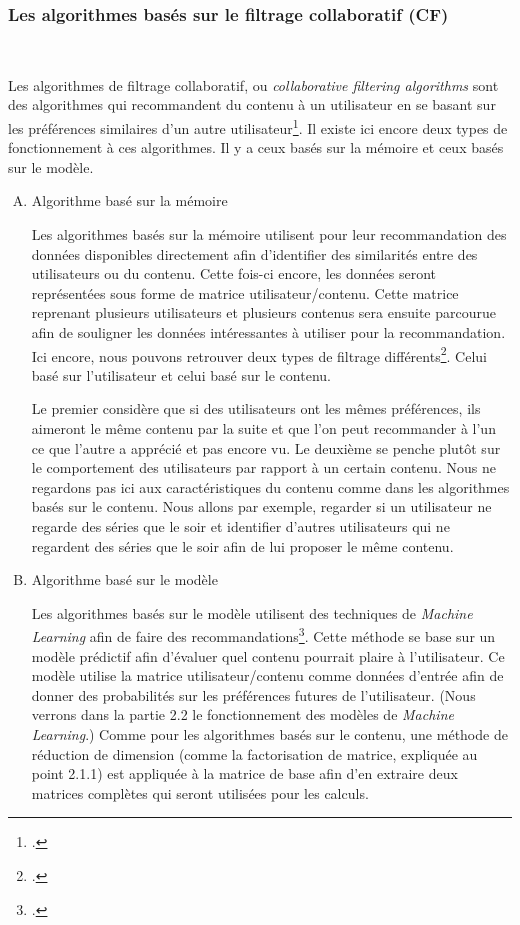 \documentclass[12pt,a4paper]{article}
\begin{document}
\subsubsection{Les algorithmes basés sur le filtrage collaboratif (CF)}
~

Les algorithmes de filtrage collaboratif, ou \textit{collaborative filtering algorithms} sont des algorithmes qui recommandent du contenu à un utilisateur en se basant sur les préférences similaires d'un autre utilisateur\footcite{Oufaida2008}. Il existe ici encore deux types de fonctionnement à ces algorithmes. Il y a ceux basés sur la mémoire et ceux basés sur le modèle.
\begin{enumerate}[(A)]
	\item Algorithme basé sur la mémoire

Les algorithmes basés sur la mémoire utilisent pour leur recommandation des données disponibles directement afin d'identifier des similarités entre des utilisateurs ou du contenu. 
Cette fois-ci encore, les données seront représentées sous forme de matrice utilisateur/contenu. Cette matrice reprenant plusieurs utilisateurs et plusieurs contenus sera ensuite parcourue afin de souligner les données intéressantes à utiliser pour la recommandation. Ici encore, nous pouvons retrouver deux types de filtrage différents\footcite{ibm_recommendation_engine}. Celui basé sur l'utilisateur et celui basé sur le contenu. 

Le premier considère que si des utilisateurs ont les mêmes préférences, ils aimeront le même contenu par la suite et que l'on peut recommander à l'un ce que l'autre a apprécié et pas encore vu.
Le deuxième se penche plutôt sur le comportement des utilisateurs par rapport à un certain contenu. Nous ne regardons pas ici aux caractéristiques du contenu comme dans les algorithmes basés sur le contenu. Nous allons par exemple, regarder si un utilisateur ne regarde des séries que le soir et identifier d'autres utilisateurs qui ne regardent des séries que le soir afin de lui proposer le même contenu.

	\item Algorithme basé sur le modèle
    
Les algorithmes basés sur le modèle utilisent des techniques de \textit{Machine Learning} afin de faire des recommandations\footcite{ibm_recommendation_engine}. Cette méthode se base sur un modèle prédictif afin d'évaluer quel contenu pourrait plaire à l'utilisateur. Ce modèle utilise la matrice utilisateur/contenu comme données d'entrée afin de donner des probabilités sur les préférences futures de l'utilisateur. (Nous verrons dans la partie 2.2 le fonctionnement des modèles de \textit{Machine Learning}.)
Comme pour les algorithmes basés sur le contenu, une méthode de réduction de dimension (comme la factorisation de matrice, expliquée au point 2.1.1) est appliquée à la matrice de base afin d'en extraire deux matrices complètes qui seront utilisées pour les calculs.
\end{enumerate}
\end{document}
